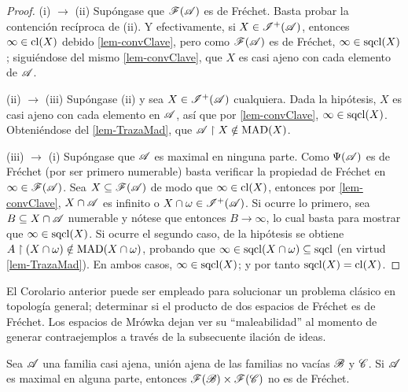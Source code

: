\begin{proof}
	(i) $\to$ (ii) Supóngase que $\mathscr{F}(\mathscr{A})$ es de Fréchet. Basta probar la contención recíproca de (ii). Y efectivamente, si $X \in \mathscr{I}^+(\mathscr{A})$, entonces $\infty \in \operatorname{cl}(X)$ debido \ref{lem-convClave}, pero como $\mathscr{F}(\mathscr{A})$ es de Fréchet, $\infty \in \operatorname{sqcl}(X)$; siguiéndose del mismo \autoref{lem-convClave}, que $X$ es casi ajeno con cada elemento de $\mathscr{A}$.

	(ii) $\to$ (iii) Supóngase (ii) y sea $X \in \mathscr{I}^+(\mathscr{A})$ cualquiera. Dada la hipótesis, $X$ es casi ajeno con cada elemento en $\mathscr{A}$, así que por \ref{lem-convClave}, $\infty \in \operatorname{sqcl}(X)$. Obteniéndose del \autoref{lem-TrazaMad}, que $\mathscr{A} \upharpoonright X \notin \operatorname{MAD}(X)$.

	(iii) $\to$ (i) Supóngase que $\mathscr{A}$ es maximal en ninguna parte. Como $\Psi(\mathscr{A})$ es de Fréchet (por ser primero numerable) basta verificar la propiedad de Fréchet en $\infty \in \mathscr{F}(\mathscr{A})$. Sea $X \subseteq \mathscr{F}(\mathscr{A})$ de modo que $\infty \in \operatorname{cl}(X)$, entonces por \ref{lem-convClave}, $X \cap \mathscr{A}$ es infinito o $X \cap \omega \in \mathscr{I}^+(\mathscr{A})$. Si ocurre lo primero, sea $B \subseteq X \cap \mathscr{A}$ numerable y nótese que entonces $B \to \infty$, lo cual basta para mostrar que $\infty \in \operatorname{sqcl}(X)$. Si ocurre el segundo caso, de la hipótesis se obtiene $A \upharpoonright (X \cap \omega) \notin \operatorname{MAD}(X \cap \omega)$, probando que $\infty \in \operatorname{sqcl}(X \cap \omega) \subseteq \operatorname{sqcl}$ (en virtud \ref{lem-TrazaMad}). En ambos casos, $\infty \in \operatorname{sqcl}(X)$; y por tanto $\operatorname{sqcl}(X)=\operatorname{cl}(X)$.
\end{proof}

El Corolario anterior puede ser empleado para solucionar un problema clásico en topología general; determinar si el producto de dos espacios de Fréchet es de Fréchet. Los espacios de Mrówka dejan ver su ``maleabilidad'' al momento de generar contraejemplos a través de la subsecuente ilación de ideas.

\begin{proposicion}
	Sea $\mathscr{A}$ una familia casi ajena, unión ajena de las familias no vacías $\mathscr{B}$ y $\mathscr{C}$. Si $\mathscr{A}$ es maximal en alguna parte, entonces $\mathscr{F}(\mathscr{B}) \times \mathscr{F}(\mathscr{C})$ no es de Fréchet.
\end{proposicion}

